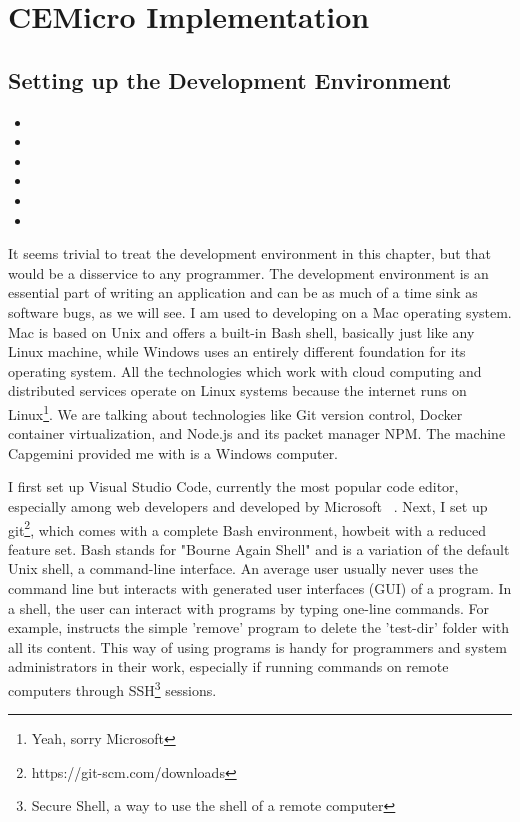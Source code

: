 \chapter{CEMicro Implementation}
\label{sec:impl}


\section{Setting up the Development Environment}

\begin{itemize}
  \item {}
  \item {}
  \item {}
  \item {}
  \item {}
  \item {}
\end{itemize}

It seems trivial to treat the development environment in this chapter, but that would be a disservice to any programmer. The development environment is an essential part of writing an application and can be as much of a time sink as software bugs, as we will see. I am used to developing on a Mac operating system. Mac is based on Unix and offers a built-in Bash shell, basically just like any Linux machine, while Windows uses an entirely different foundation for its operating system. All the technologies which work with cloud computing and distributed services operate on Linux systems because the internet runs on Linux\footnote{Yeah, sorry Microsoft}. We are talking about technologies like Git version control, Docker container virtualization, and Node.js and its packet manager NPM. The machine Capgemini provided me with is a Windows computer.

I first set up Visual Studio Code, currently the most popular code editor, especially among web developers and developed by Microsoft ~\cite{stackoverflow.2019}. Next, I set up git\footnote{https://git-scm.com/downloads}, which comes with a complete Bash environment, howbeit with a reduced feature set. Bash stands for "Bourne Again Shell" and is a variation of the default Unix shell, a command-line interface. An average user usually never uses the command line but interacts with generated user interfaces (GUI) of a program. In a shell, the user can interact with programs by typing one-line commands. For example,  instructs the simple 'remove' program to delete the 'test-dir' folder with all its content. This way of using programs is handy for programmers and system administrators in their work, especially if running commands on remote computers through SSH\footnote{Secure Shell, a way to use the shell of a remote computer} sessions.

